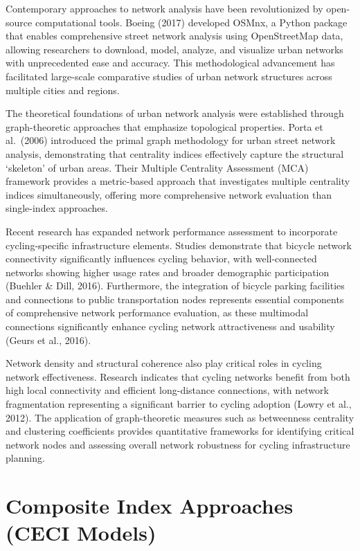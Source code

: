 \documentclass[
  12pt,
  oneside]{book}
\begin{document}
Contemporary approaches to network analysis have been revolutionized by open-source computational tools. Boeing (2017) developed OSMnx, a Python package that enables comprehensive street network analysis using OpenStreetMap data, allowing researchers to download, model, analyze, and visualize urban networks with unprecedented ease and accuracy. This methodological advancement has facilitated large-scale comparative studies of urban network structures across multiple cities and regions.

The theoretical foundations of urban network analysis were established through graph-theoretic approaches that emphasize topological properties. Porta et al.~(2006) introduced the primal graph methodology for urban street network analysis, demonstrating that centrality indices effectively capture the structural `skeleton' of urban areas. Their Multiple Centrality Assessment (MCA) framework provides a metric-based approach that investigates multiple centrality indices simultaneously, offering more comprehensive network evaluation than single-index approaches.

Recent research has expanded network performance assessment to incorporate cycling-specific infrastructure elements. Studies demonstrate that bicycle network connectivity significantly influences cycling behavior, with well-connected networks showing higher usage rates and broader demographic participation (Buehler \& Dill, 2016). Furthermore, the integration of bicycle parking facilities and connections to public transportation nodes represents essential components of comprehensive network performance evaluation, as these multimodal connections significantly enhance cycling network attractiveness and usability (Geurs et al., 2016).

Network density and structural coherence also play critical roles in cycling network effectiveness. Research indicates that cycling networks benefit from both high local connectivity and efficient long-distance connections, with network fragmentation representing a significant barrier to cycling adoption (Lowry et al., 2012). The application of graph-theoretic measures such as betweenness centrality and clustering coefficients provides quantitative frameworks for identifying critical network nodes and assessing overall network robustness for cycling infrastructure planning.

\section{Composite Index Approaches (CECI Models)}\label{composite-index-approaches-ceci-models}
\end{document}
